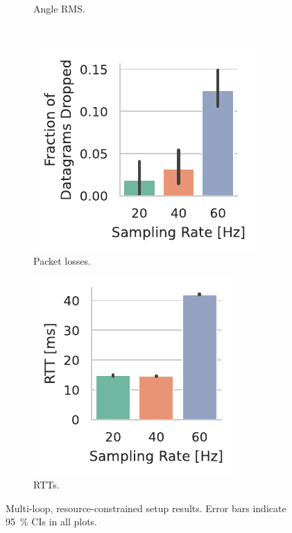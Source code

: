 \begin{figure}[t]
\begin{subfigure}[h]{.22\textwidth}
        \caption{Angle \ac{RMS}.}\label{fig:video:rms}
    \end{subfigure}\\
    \begin{subfigure}[h]{.22\textwidth}
        \centering
        \includegraphics[width=\textwidth]{publications/2022CLEAVE/plots/fixed_video_drop_frac}
        \caption{Packet losses.}\label{fig:video:drop}
    \end{subfigure}%
    \hfill%
    \begin{subfigure}[h]{.22\textwidth}
        \centering
        \includegraphics[width=\textwidth]{publications/2022CLEAVE/plots/fixed_video_rtt}
        \caption{\acsp{RTT}.}\label{fig:video:rtt}
    \end{subfigure}%
    \caption{
        Multi-loop, resource-constrained setup results.
        Error bars indicate \SI{95}{\percent} \acp{CI} in all plots.
    }\label{fig:video:results}
\end{figure}

